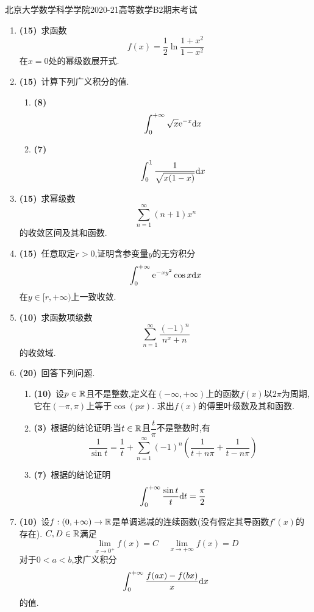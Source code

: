\documentclass{ctexart}
\begin{document}
\pagestyle{empty}
\begin{center}\Large
    北京大学数学科学学院2020-21高等数学B2期末考试
\end{center}
\begin{enumerate}[leftmargin=*,label=\textbf{\arabic*.},topsep=0pt,parsep=0pt,itemsep=0pt,partopsep=0pt]
    \item \textbf{(15)}\ 求函数
        \[f(x)=\dfrac12\ln\dfrac{1+x^2}{1-x^2}\]
        在$x=0$处的幂级数展开式.

    \item \textbf{(15)}\ 计算下列广义积分的值.
        \begin{enumerate}[label=\tbf{(\arabic*)},topsep=0pt,parsep=0pt,itemsep=0pt,partopsep=0pt]
            \item \textbf{(8)}
                \[\int_0^{+\infty}\sqrt{x}\mathrm{e}^{-x}\mathrm{d} x\]
            \item \textbf{(7)}\ 
                \[\int_0^1\dfrac{1}{\sqrt{x(1-x)}}\mathrm{d} x\]
        \end{enumerate}

    \item \textbf{(15)}\ 求幂级数
        \[\sum_{n=1}^{\infty}(n+1)x^n\]
        的收敛区间及其和函数.

    \item \textbf{(15)}\ 任意取定$r>0$,证明含参变量$y$的无穷积分
        \[\int_0^{+\infty}\mathrm{e}^{-xy^2}\cos x\mathrm{d} x\]
        在$y\in[r,+\infty)$上一致收敛.

    \item \textbf{(10)}\ 求函数项级数
        \[\sum_{n=1}^\infty\dfrac{(-1)^n}{n^x+n}\]
        的收敛域.

    \item \textbf{(20)}\ 回答下列问题.
        \begin{enumerate}[label=\tbf{(\arabic*)},topsep=0pt,parsep=0pt,itemsep=0pt,partopsep=0pt]
            \item \textbf{(10\songti{分})}\ 设$p\in\mathbb{R}$且不是整数,定义在$(-\infty,+\infty)$上的函数$f(x)$以$2\pi$为周期,它在$(-\pi,\pi)$上等于$\cos(px)$.%
                求出$f(x)$的傅里叶级数及其和函数.
            \item \textbf{(3)}\ 根据的结论证明:当$t\in\mathbb{R}$且$\dfrac{t}{\pi}$不是整数时,有
                \[\dfrac{1}{\sin t}=\dfrac1t+\sum_{n=1}^{\infty}(-1)^n\left(\dfrac{1}{t+n\pi}+\dfrac{1}{t-n\pi}\right)\]
            \item \textbf{(7\songti{分})}\ 根据\tbf{(2)}的结论证明
                \[\int_0^{+\infty}\dfrac{\sin t}{t}\mathrm{d} t=\dfrac\pi2\]

        \end{enumerate}

    \item \textbf{(10)}\ 设$f:(0,+\infty)\to\mathbb{R}$是单调递减的连续函数(没有假定其导函数$f'(x)$的存在).%
        $C,D\in\mathbb{R}$满足
        \[\lim_{x\to0^+}f(x)=C\ \ \ \ \ \lim_{x\to+\infty}f(x)=D\]
        对于$0<a<b$,求广义积分
        \[\int_0^{+\infty}\dfrac{f(ax)-f(bx)}{x}\mathrm{d} x\]
        的值.

\end{enumerate}
\end{document}
